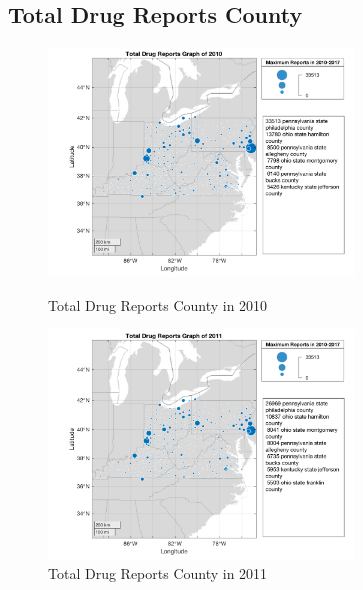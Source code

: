 \documentclass{mcmthesis}
\begin{document}
\begin{appendices}
\section{Total Drug Reports County}\label{Total Drug Reports County}

\begin{figure}[H]
\centering
\begin{minipage}[t]{0.45\textwidth}
\centering
\includegraphics[width=3.2in]{figures/TotalDrugReportsCounty2010.png}
\caption{Total Drug Reports County in 2010}
\label{Total Drug Reports County in 2010}
\end{minipage}
\hfill
\begin{minipage}[t]{0.45\textwidth}
\centering
\includegraphics[width=3.2in]{figures/TotalDrugReportsCounty2011.png}
\caption{Total Drug Reports County in 2011}
\label{Total Drug Reports County in 2011}
\end{minipage}
\end{figure}


\end{appendices}
\end{document}

